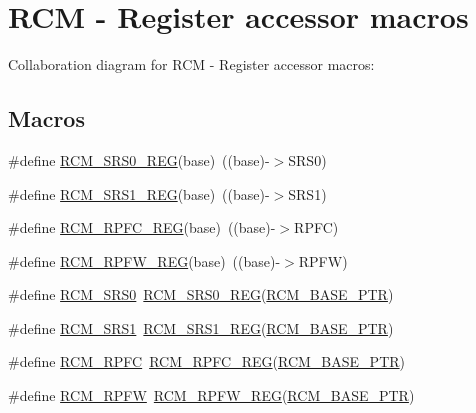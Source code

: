 \hypertarget{group___r_c_m___register___accessor___macros}{}\section{R\+CM -\/ Register accessor macros}
\label{group___r_c_m___register___accessor___macros}
Collaboration diagram for R\+CM -\/ Register accessor macros\+:
\subsection*{Macros}
\begin{DoxyCompactItemize}
\item 
\#define \hyperlink{group___r_c_m___register___accessor___macros_gab75f78e13fd4a015cada6728b29c681c}{R\+C\+M\+\_\+\+S\+R\+S0\+\_\+\+R\+EG}(base)~((base)-\/$>$S\+R\+S0)
\item 
\#define \hyperlink{group___r_c_m___register___accessor___macros_ga6b4794a4c891e1ede19dc7a446870489}{R\+C\+M\+\_\+\+S\+R\+S1\+\_\+\+R\+EG}(base)~((base)-\/$>$S\+R\+S1)
\item 
\#define \hyperlink{group___r_c_m___register___accessor___macros_ga361aa484c058d992d93d6f61316029f3}{R\+C\+M\+\_\+\+R\+P\+F\+C\+\_\+\+R\+EG}(base)~((base)-\/$>$R\+P\+FC)
\item 
\#define \hyperlink{group___r_c_m___register___accessor___macros_ga0be970e23a295c11f2e80b9f83ae4dbe}{R\+C\+M\+\_\+\+R\+P\+F\+W\+\_\+\+R\+EG}(base)~((base)-\/$>$R\+P\+FW)
\item 
\#define \hyperlink{group___r_c_m___register___accessor___macros_gaae0200bfd0eb1d7f7fd0d142c21fe92a}{R\+C\+M\+\_\+\+S\+R\+S0}~\hyperlink{group___r_c_m___register___accessor___macros_gab75f78e13fd4a015cada6728b29c681c}{R\+C\+M\+\_\+\+S\+R\+S0\+\_\+\+R\+EG}(\hyperlink{group___r_c_m___peripheral_ga25ab3aa8d593d455ed36a52c77f88234}{R\+C\+M\+\_\+\+B\+A\+S\+E\+\_\+\+P\+TR})
\item 
\#define \hyperlink{group___r_c_m___register___accessor___macros_gaa2e190bc843511a82e9ec826029fbaaa}{R\+C\+M\+\_\+\+S\+R\+S1}~\hyperlink{group___r_c_m___register___accessor___macros_ga6b4794a4c891e1ede19dc7a446870489}{R\+C\+M\+\_\+\+S\+R\+S1\+\_\+\+R\+EG}(\hyperlink{group___r_c_m___peripheral_ga25ab3aa8d593d455ed36a52c77f88234}{R\+C\+M\+\_\+\+B\+A\+S\+E\+\_\+\+P\+TR})
\item 
\#define \hyperlink{group___r_c_m___register___accessor___macros_ga1c19f66051e218d534efc33ec09cc461}{R\+C\+M\+\_\+\+R\+P\+FC}~\hyperlink{group___r_c_m___register___accessor___macros_ga361aa484c058d992d93d6f61316029f3}{R\+C\+M\+\_\+\+R\+P\+F\+C\+\_\+\+R\+EG}(\hyperlink{group___r_c_m___peripheral_ga25ab3aa8d593d455ed36a52c77f88234}{R\+C\+M\+\_\+\+B\+A\+S\+E\+\_\+\+P\+TR})
\item 
\#define \hyperlink{group___r_c_m___register___accessor___macros_ga4cf7545d65e6e6c3e1848b7687d8f367}{R\+C\+M\+\_\+\+R\+P\+FW}~\hyperlink{group___r_c_m___register___accessor___macros_ga0be970e23a295c11f2e80b9f83ae4dbe}{R\+C\+M\+\_\+\+R\+P\+F\+W\+\_\+\+R\+EG}(\hyperlink{group___r_c_m___peripheral_ga25ab3aa8d593d455ed36a52c77f88234}{R\+C\+M\+\_\+\+B\+A\+S\+E\+\_\+\+P\+TR})
\end{DoxyCompactItemize}


